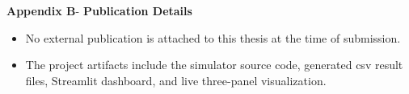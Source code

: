 \begin{center}
	{\Large \textbf{Appendix B}}-\vspace*{0.5 cm}
	{\Large \textbf{Publication Details}}
\end{center}

\begin{center}
	\begin{itemize}
		\item No external publication is attached to this thesis at the time of submission.
		\item The project artifacts include the simulator source code, generated \ac{csv} result files, Streamlit dashboard, and live three-panel visualization.
	\end{itemize}
\end{center}
